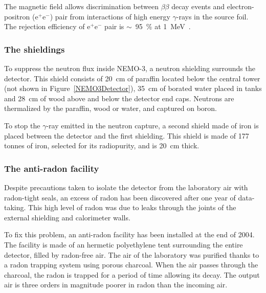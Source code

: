\documentclass[main.tex]{subfiles}
\begin{document}
\bigskip


\NI The magnetic field allows discrimination between $\beta\beta$ decay events and electron-positron (e$^+$e$^-$) pair from interactions of high energy $\gamma$-rays in the source foil. The rejection efficiency of e$^+$e$^-$ pair is $\sim$~95~\% at 1~MeV~\cite{NEMO-3-detector}. 

\bigskip


\subsubsection{The shieldings}


\NI To suppress the neutron flux inside NEMO-3, a neutron shielding surrounds the detector. This shield consists of 20~cm of paraffin located below the central tower (not shown in Figure~\ref{NEMO3Detector}), 35~cm of borated water placed in tanks and 28~cm of wood above and below the detector end caps. Neutrons are thermalized by the paraffin, wood or water, and captured on boron. 


\bigskip

\NI To stop the $\gamma$-ray emitted in the neutron capture, a second shield made of iron is placed between the detector and the first shielding. This shield is made of 177 tonnes of iron, selected for its radiopurity, and is 20~cm thick.


\subsubsection{The anti-radon facility}


\NI Despite precautions taken to isolate the detector from the laboratory air with radon-tight seals, an excess of radon has been discovered after one year of data-taking. This high level of radon was due to leaks through the joints of the external shielding and calorimeter walls.


\bigskip


\NI To fix this problem, an anti-radon facility has been installed at the end of 2004. The facility is made of an hermetic polyethylene tent surrounding the entire detector, filled by radon-free air. The air of the laboratory was purified thanks to a radon trapping system using porous charcoal. When the air passes through the charcoal, the radon is trapped for a period of time allowing its decay. The output air is three orders in magnitude poorer in radon than the incoming air.


\bigskip
\end{document}
